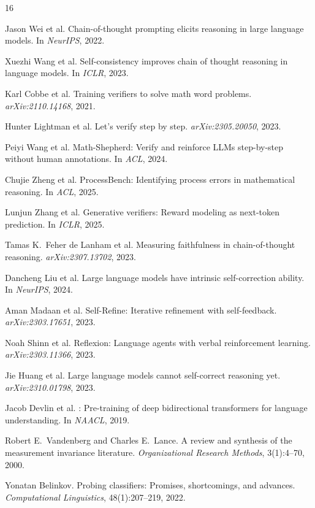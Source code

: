 \documentclass[10pt,twocolumn]{article}
\begin{document}

\begin{thebibliography}{16}

Jason Wei et al.
\newblock Chain-of-thought prompting elicits reasoning in large language models.
\newblock In \emph{NeurIPS}, 2022.

Xuezhi Wang et al.
\newblock Self-consistency improves chain of thought reasoning in language models.
\newblock In \emph{ICLR}, 2023.

Karl Cobbe et al.
\newblock Training verifiers to solve math word problems.
\newblock \emph{arXiv:2110.14168}, 2021.

Hunter Lightman et al.
\newblock Let's verify step by step.
\newblock \emph{arXiv:2305.20050}, 2023.

Peiyi Wang et al.
\newblock Math-Shepherd: Verify and reinforce {LLM}s step-by-step without human annotations.
\newblock In \emph{ACL}, 2024.

Chujie Zheng et al.
\newblock ProcessBench: Identifying process errors in mathematical reasoning.
\newblock In \emph{ACL}, 2025.

Lunjun Zhang et al.
\newblock Generative verifiers: Reward modeling as next-token prediction.
\newblock In \emph{ICLR}, 2025.

Tamas K.\ Feher de Lanham et al.
\newblock Measuring faithfulness in chain-of-thought reasoning.
\newblock \emph{arXiv:2307.13702}, 2023.

Dancheng Liu et al.
\newblock Large language models have intrinsic self-correction ability.
\newblock In \emph{NeurIPS}, 2024.

Aman Madaan et al.
\newblock Self-Refine: Iterative refinement with self-feedback.
\newblock \emph{arXiv:2303.17651}, 2023.

Noah Shinn et al.
\newblock Reflexion: Language agents with verbal reinforcement learning.
\newblock \emph{arXiv:2303.11366}, 2023.

Jie Huang et al.
\newblock Large language models cannot self-correct reasoning yet.
\newblock \emph{arXiv:2310.01798}, 2023.

Jacob Devlin et al.
: Pre-training of deep bidirectional transformers for language understanding.
\newblock In \emph{NAACL}, 2019.

Robert E.\ Vandenberg and Charles E.\ Lance.
\newblock A review and synthesis of the measurement invariance literature.
\newblock \emph{Organizational Research Methods}, 3(1):4--70, 2000.

Yonatan Belinkov.
\newblock Probing classifiers: Promises, shortcomings, and advances.
\newblock \emph{Computational Linguistics}, 48(1):207--219, 2022.

\end{thebibliography}
\end{document}
